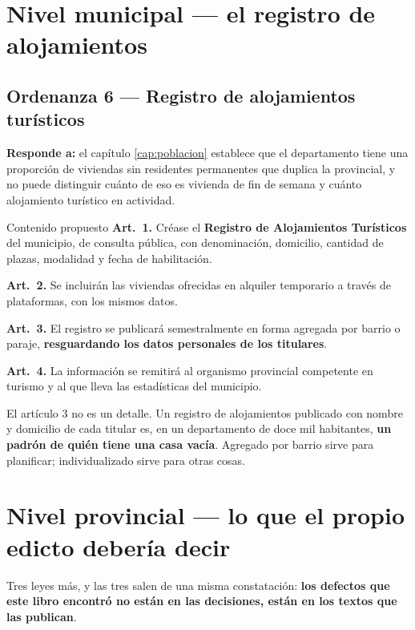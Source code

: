 \section{Nivel municipal --- el registro de alojamientos}

\subsection{Ordenanza 6 --- Registro de alojamientos turísticos}

\textbf{Responde a:} el capítulo \ref{cap:poblacion} establece que el departamento tiene una
proporción de viviendas sin residentes permanentes que duplica la provincial, y no puede
distinguir cuánto de eso es vivienda de fin de semana y cuánto alojamiento turístico en
actividad.

\begin{ficha}{Contenido propuesto}
\textbf{Art.\ 1.} Créase el \textbf{Registro de Alojamientos Turísticos} del municipio, de
consulta pública, con denominación, domicilio, cantidad de plazas, modalidad y fecha de
habilitación.

\textbf{Art.\ 2.} Se incluirán las viviendas ofrecidas en alquiler temporario a través de
plataformas, con los mismos datos.

\textbf{Art.\ 3.} El registro se publicará semestralmente en forma agregada por barrio o
paraje, \textbf{resguardando los datos personales de los titulares}.

\textbf{Art.\ 4.} La información se remitirá al organismo provincial competente en turismo y
al que lleva las estadísticas del municipio.
\end{ficha}

\begin{cautela}
El artículo 3 no es un detalle. Un registro de alojamientos publicado con nombre y domicilio
de cada titular es, en un departamento de doce mil habitantes, \textbf{un padrón de
quién tiene una casa vacía}. Agregado por barrio sirve para planificar; individualizado sirve
para otras cosas.
\end{cautela}

\section{Nivel provincial --- lo que el propio edicto debería decir}

Tres leyes más, y las tres salen de una misma constatación: \textbf{los defectos que este libro
encontró no están en las decisiones, están en los textos que las publican}.

